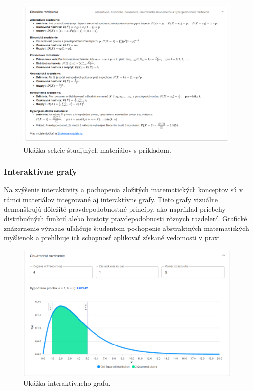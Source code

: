 \begin{figure}[H]
  \centering
  \includegraphics[width=14cm]{img/materialy.png}
  \caption{Ukážka sekcie študijných materiálov s príkladom.}
  \label{materialy}
  \end{figure}

\subsubsection*{Interaktívne grafy}
Na zvýšenie interaktivity a pochopenia zložitých matematických konceptov sú v rámci materiálov integrované aj interaktívne grafy. 
Tieto grafy vizuálne demonštrujú dôležité pravdepodobnostné princípy, ako napríklad priebehy distribučných funkcií alebo hustoty pravdepodobnosti rôznych rozdelení. 
Grafické znázornenie výrazne uľahčuje študentom pochopenie abstraktných matematických myšlienok a prehlbuje ich schopnosť aplikovať získané vedomosti v praxi.
\begin{figure}[H]
  \centering
  \includegraphics[width=14cm]{img/grafy.png}
  \caption{Ukážka interaktívneho grafu.}
  \label{grafy}
  \end{figure}

